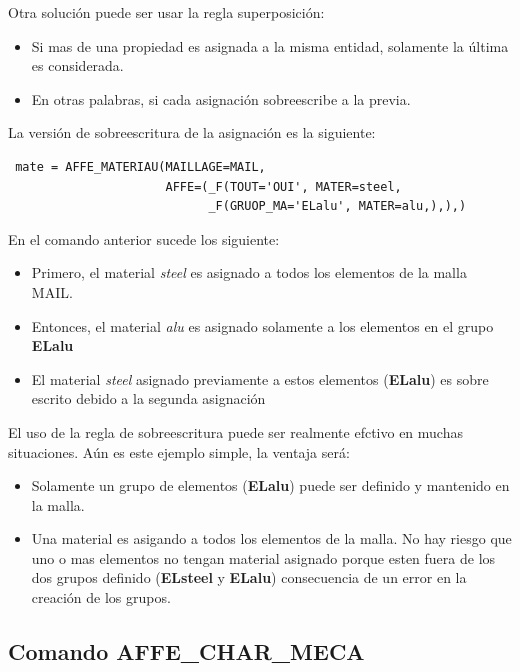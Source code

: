 \documentclass[12pt]{book}
\theoremstyle{definition}
\theoremstyle{remark}
\theoremstyle{plain}
\begin{document}
Otra solución puede ser usar la regla superposición:

\begin{itemize}
 \item Si mas de una propiedad es asignada a la misma entidad, solamente la
 última es considerada.
 \item En otras palabras, si cada asignación sobreescribe a la previa.
\end{itemize}

La versión de sobreescritura de la asignación es la siguiente:

\begin{verbatim}
 mate = AFFE_MATERIAU(MAILLAGE=MAIL, 
                      AFFE=(_F(TOUT='OUI', MATER=steel,
                            _F(GRUOP_MA='ELalu', MATER=alu,),),)
\end{verbatim}

En el comando anterior sucede los siguiente:

\begin{itemize}
 \item Primero, el material \textit{steel} es asignado a todos los elementos de 
la malla MAIL.
 \item Entonces, el material \textit{alu} es asignado solamente a los elementos
en el grupo \textbf{ELalu}
 \item El material \textit{steel} asignado previamente a estos elementos
(\textbf{ELalu}) es sobre escrito debido a la segunda asignación
\end{itemize}

El uso de la regla de sobreescritura puede ser realmente efctivo en muchas 
situaciones. Aún es este ejemplo simple, la ventaja será:

\begin{itemize}
 \item Solamente un grupo de elementos (\textbf{ELalu}) puede ser definido
y mantenido en la malla.
 \item Una material es asigando a todos los elementos de la malla. No hay
riesgo que uno o mas elementos no tengan material asignado porque esten fuera de los
dos grupos definido (\textbf{ELsteel} y \textbf{ELalu}) consecuencia de un error en
la creación de los grupos. 
\end{itemize}

\subsection{Comando AFFE\_CHAR\_MECA}
\end{document}
